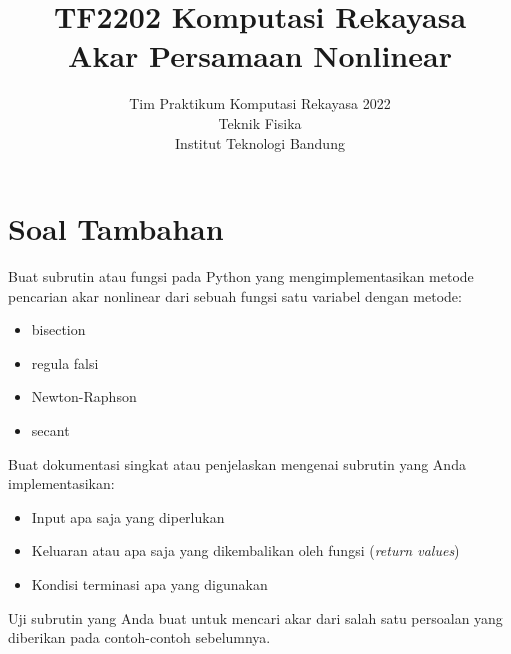 



\title{%
{\small TF2202 Komputasi Rekayasa}\\
Akar Persamaan Nonlinear
}
\author{Tim Praktikum Komputasi Rekayasa 2022\\
Teknik Fisika\\
Institut Teknologi Bandung}
\date{}
\maketitle















\section{Soal Tambahan}

\begin{soal}
Buat subrutin atau fungsi pada Python yang mengimplementasikan metode pencarian akar nonlinear
dari sebuah fungsi satu variabel dengan metode:
\begin{itemize}
\item bisection
\item regula falsi
\item Newton-Raphson
\item secant
\end{itemize}
Buat dokumentasi singkat atau penjelaskan mengenai subrutin yang Anda implementasikan:
\begin{itemize}
\item Input apa saja yang diperlukan
\item Keluaran atau apa saja yang dikembalikan oleh fungsi (\textit{return values})
\item Kondisi terminasi apa yang digunakan
\end{itemize}
Uji subrutin yang Anda buat untuk mencari akar dari salah satu persoalan yang
diberikan pada contoh-contoh sebelumnya.
\end{soal}















